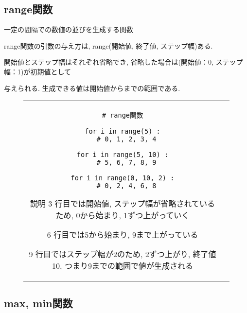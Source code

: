 \documentclass{jsarticle}
\begin{document}
\subsection{range関数}
一定の間隔での数値の並びを生成する関数 \par
range関数の引数の与え方は, range(開始値, 終了値, ステップ幅)ある.  \par
開始値とステップ幅はそれぞれ省略でき, 省略した場合は(開始値：0, ステップ幅：1)が初期値として  \par
与えられる. 生成できる値は開始値から{}までの範囲である.
\vspace{-5mm}
\begin{figure}[h]
	\begin{tabular}{cc}
		\begin{minipage}[t]{.4\textwidth}
			\begin{lstlisting}[caption=range関数]
# range関数

for i in range(5) :
  # 0, 1, 2, 3, 4

for i in range(5, 10) :
  # 5, 6, 7, 8, 9

for i in range(0, 10, 2) :
  # 0, 2, 4, 6, 8
\end{lstlisting}
		\end{minipage} \hspace{5mm}
		\begin{minipage}[t]{.6\textwidth}
			\begin{itembox}[l]{説明}
				3 行目では開始値, ステップ幅が省略されているため, 0から始まり, 1ずつ上がっていく\par
				6 行目では5から始まり, 9まで上がっている\par
				9 行目ではステップ幅が2のため, 2ずつ上がり, 終了値10, つまり9までの範囲で値が生成される
			\end{itembox}
		\end{minipage}
	\end{tabular}
\end{figure}

\subsection{max, min関数}
\end{document}
